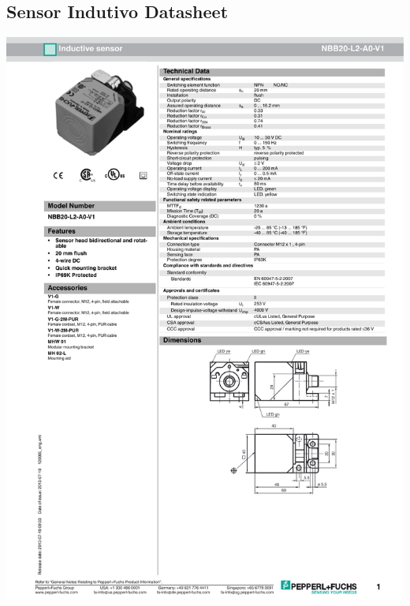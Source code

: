 \begin{appendices}
\subsection{Sensor Indutivo Datasheet}
\includegraphics[width=1\columnwidth]{figs/datasheets/inductive.pdf}


\end{appendices}
